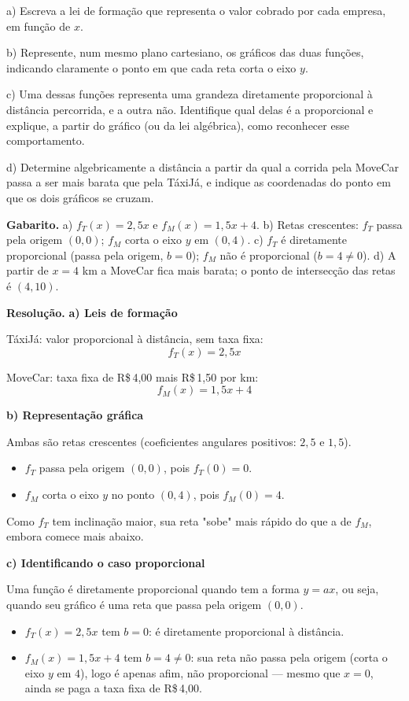 \documentclass[11pt,a4paper]{article}
\begin{document}
a) Escreva a lei de formação que representa o valor cobrado por cada empresa, em função de $x$.

b) Represente, num mesmo plano cartesiano, os gráficos das duas funções, indicando claramente o ponto em que cada reta corta o eixo $y$.

c) Uma dessas funções representa uma grandeza diretamente proporcional à distância percorrida, e a outra não. Identifique qual delas é a proporcional e explique, a partir do gráfico (ou da lei algébrica), como reconhecer esse comportamento.

d) Determine algebricamente a distância a partir da qual a corrida pela MoveCar passa a ser mais barata que pela TáxiJá, e indique as coordenadas do ponto em que os dois gráficos se cruzam.

\textbf{Gabarito.} a) $f_T(x)=2{,}5x$ e $f_M(x)=1{,}5x+4$. b) Retas crescentes: $f_T$ passa pela origem $(0,0)$; $f_M$ corta o eixo $y$ em $(0,4)$. c) $f_T$ é diretamente proporcional (passa pela origem, $b=0$); $f_M$ não é proporcional ($b=4\neq 0$). d) A partir de $x=4$ km a MoveCar fica mais barata; o ponto de intersecção das retas é $(4,10)$.

\textbf{Resolução.} \textbf{a) Leis de formação}

TáxiJá: valor proporcional à distância, sem taxa fixa:
$$f_T(x) = 2{,}5x$$

MoveCar: taxa fixa de R\$\,4,00 mais R\$\,1,50 por km:
$$f_M(x) = 1{,}5x + 4$$

\textbf{b) Representação gráfica}

Ambas são retas crescentes (coeficientes angulares positivos: $2{,}5$ e $1{,}5$).

\begin{itemize}[nosep,leftmargin=*]
\item $f_T$ passa pela origem $(0,0)$, pois $f_T(0)=0$.
\item $f_M$ corta o eixo $y$ no ponto $(0,4)$, pois $f_M(0)=4$.
\end{itemize}

Como $f_T$ tem inclinação maior, sua reta "sobe" mais rápido do que a de $f_M$, embora comece mais abaixo.

\textbf{c) Identificando o caso proporcional}

Uma função é diretamente proporcional quando tem a forma $y=ax$, ou seja, quando seu gráfico é uma reta que passa pela origem $(0,0)$.

\begin{itemize}[nosep,leftmargin=*]
\item $f_T(x)=2{,}5x$ tem $b=0$: é diretamente proporcional à distância.
\item $f_M(x)=1{,}5x+4$ tem $b=4 \neq 0$: sua reta não passa pela origem (corta o eixo $y$ em $4$), logo é apenas afim, não proporcional — mesmo que $x=0$, ainda se paga a taxa fixa de R\$\,4,00.
\end{itemize}
\end{document}
